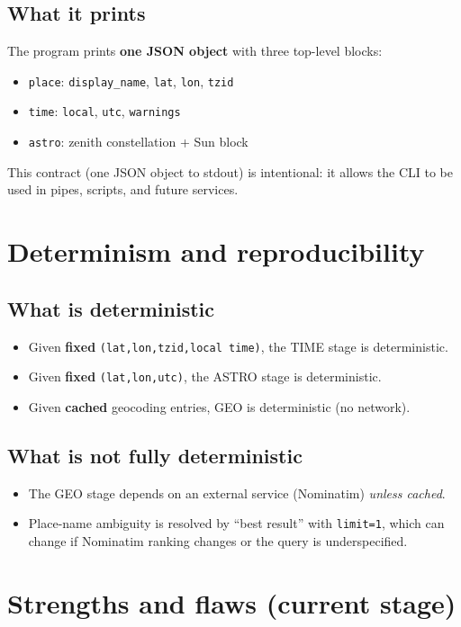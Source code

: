 \documentclass[11pt,a4paper]{article}
\begin{document}
\subsection{What it prints}
The program prints \textbf{one JSON object} with three top-level blocks:
\begin{itemize}
  \item \texttt{place}: \texttt{display\_name}, \texttt{lat}, \texttt{lon}, \texttt{tzid}
  \item \texttt{time}: \texttt{local}, \texttt{utc}, \texttt{warnings}
  \item \texttt{astro}: zenith constellation + Sun block
\end{itemize}

This contract (one JSON object to stdout) is intentional: it allows the CLI to be used in pipes,
scripts, and future services.

\section{Determinism and reproducibility}
\subsection{What is deterministic}
\begin{itemize}
  \item Given \textbf{fixed} \texttt{(lat,lon,tzid,local time)}, the TIME stage is deterministic.
  \item Given \textbf{fixed} \texttt{(lat,lon,utc)}, the ASTRO stage is deterministic.
  \item Given \textbf{cached} geocoding entries, GEO is deterministic (no network).
\end{itemize}

\subsection{What is not fully deterministic}
\begin{itemize}
  \item The GEO stage depends on an external service (Nominatim) \emph{unless cached}.
  \item Place-name ambiguity is resolved by ``best result'' with \texttt{limit=1}, which can change
        if Nominatim ranking changes or the query is underspecified.
\end{itemize}

\section{Strengths and flaws (current stage)}
\end{document}
